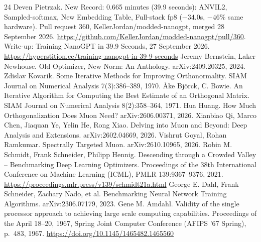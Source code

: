\documentclass{article}
\begin{document}
\begin{thebibliography}{24}
 Deven Pietrzak. New Record: 0.665 minutes (39.9 seconds): ANVIL2, Sampled-softmax, New Embedding Table, Full-stack fp8 ($-34.0$s, $-46\%$ same hardware). Pull request 360, KellerJordan/modded-nanogpt, merged 28 September 2026. \url{https://github.com/KellerJordan/modded-nanogpt/pull/360}. Write-up: Training NanoGPT in 39.9 Seconds, 27 September 2026. \url{https://hyperstition.cc/training-nanogpt-in-39-9-seconds}
 Jeremy Bernstein, Laker Newhouse. Old Optimizer, New Norm: An Anthology. arXiv:2409.20325, 2024.
 Zdislav Kovarik. Some Iterative Methods for Improving Orthonormality. SIAM Journal on Numerical Analysis 7(3):386--389, 1970.
 \AA ke Bj\"orck, C. Bowie. An Iterative Algorithm for Computing the Best Estimate of an Orthogonal Matrix. SIAM Journal on Numerical Analysis 8(2):358--364, 1971.
 Hua Huang. How Much Orthogonalization Does Muon Need? arXiv:2606.00371, 2026.
 Xianbiao Qi, Marco Chen, Jiaquan Ye, Yelin He, Rong Xiao. Delving into Muon and Beyond: Deep Analysis and Extensions. arXiv:2602.04669, 2026.
 Vishrut Goyal, Rohan Ramkumar. Spectrally Targeted Muon. arXiv:2610.10965, 2026.
 Robin M. Schmidt, Frank Schneider, Philipp Hennig. Descending through a Crowded Valley -- Benchmarking Deep Learning Optimizers. Proceedings of the 38th International Conference on Machine Learning (ICML), PMLR 139:9367--9376, 2021. \url{https://proceedings.mlr.press/v139/schmidt21a.html}
 George E. Dahl, Frank Schneider, Zachary Nado, et al. Benchmarking Neural Network Training Algorithms. arXiv:2306.07179, 2023.
 Gene M. Amdahl. Validity of the single processor approach to achieving large scale computing capabilities. Proceedings of the April 18--20, 1967, Spring Joint Computer Conference (AFIPS '67 Spring), p.~483, 1967. \url{https://doi.org/10.1145/1465482.1465560}
\end{thebibliography}

\clearpage
\appendix
\end{document}
